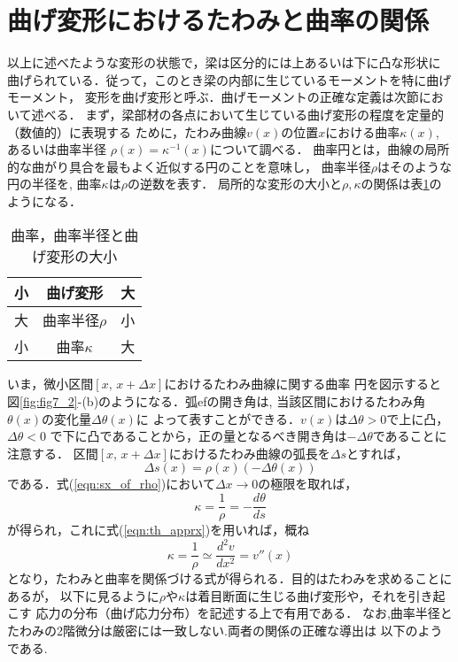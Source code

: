 \documentclass[10pt,a4j]{jarticle}
\begin{document}
\section{曲げ変形におけるたわみと曲率の関係}
以上に述べたような変形の状態で，梁は区分的には上あるいは下に凸な形状に
曲げられている．従って，このとき梁の内部に生じているモーメントを特に曲げモーメント，
変形を曲げ変形と呼ぶ．曲げモーメントの正確な定義は次節において述べる．
まず，梁部材の各点において生じている曲げ変形の程度を定量的（数値的）に表現する
ために，たわみ曲線$v(x)$の位置$x$における曲率$\kappa(x)$, あるいは曲率半径
$\rho(x)=\kappa^{-1}(x)$について調べる．
曲率円とは，曲線の局所的な曲がり具合を最もよく近似する円のことを意味し，
曲率半径$\rho$はそのような円の半径を, 曲率$\kappa$は$\rho$の逆数を表す．
局所的な変形の大小と$\rho, \kappa$の関係は表\ref{tbl:tbl7_1}のようになる．
\begin{table}
\label{tbl:tbl7_1}
\caption{曲率，曲率半径と曲げ変形の大小}
\begin{center}
\begin{tabular}{c|c|c}
小& 曲げ変形 & 大\\
\hline\hline
大&曲率半径$\rho$ & 小\\
\hline
小& 曲率$\kappa$& 大\\
\end{tabular}
\end{center}
\end{table}
いま，微小区間$[x,\, x+\Delta x]$におけるたわみ曲線に関する曲率
円を図示すると図\ref{fig:fig7_2}-(b)のようになる．弧efの開き角は, 
当該区間におけるたわみ角$\theta(x)$の変化量$\Delta \theta (x)$に
よって表すことができる．$v(x)$は$\Delta \theta >0$で上に凸，$\Delta \theta<0$
で下に凸であることから，正の量となるべき開き角は$-\Delta \theta$であることに
注意する． 区間$[x,\,x+\Delta x]$におけるたわみ曲線の弧長を$\Delta s$とすれば，
\begin{equation}
	\Delta s(x) = \rho (x) \left(-\Delta \theta (x) \right)
	\label{eqn:sx_of_rho}
\end{equation}
である．式(\ref{eqn:sx_of_rho})において$\Delta x \rightarrow 0$の極限を取れば，
\begin{equation}
	\kappa = \frac{1}{\rho}=-\frac{d\theta}{ds}	
\end{equation}
が得られ，これに式(\ref{eqn:th_apprx})を用いれば，概ね
\begin{equation}
	\kappa=\frac{1}{\rho}\simeq \frac{d^2 v}{dx^2}=v''(x)
	\label{eqn:kpp_v2}
\end{equation}
となり，たわみと曲率を関係づける式が得られる．目的はたわみを求めることにあるが，
以下に見るように$\rho$や$\kappa$は着目断面に生じる曲げ変形や，それを引き起こす
応力の分布（曲げ応力分布）を記述する上で有用である．
なお,曲率半径とたわみの2階微分は厳密には一致しない.両者の関係の正確な導出は
以下のようである.
\end{document}

